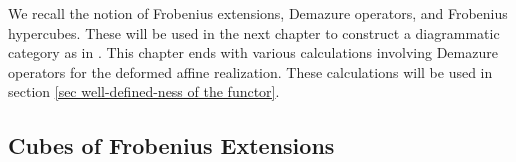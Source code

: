 We recall the notion of Frobenius extensions, Demazure operators, and Frobenius hypercubes. These will be used in the next chapter to construct a diagrammatic category as in \cite{EWSFrob}. 
This chapter ends with various calculations involving Demazure operators for the deformed affine realization. These calculations will be used in section \ref{sec well-defined-ness of the functor}.
\subsection{Cubes of Frobenius Extensions} \label{subsec- cubes of frob}


